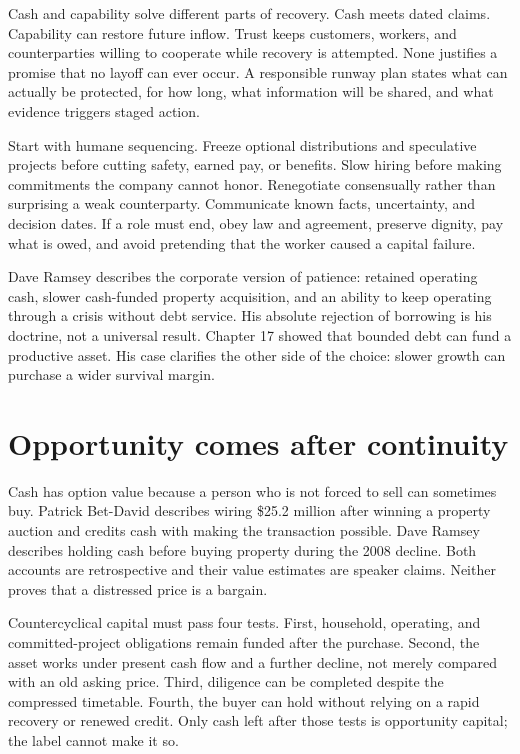 Cash and capability solve different parts of recovery. Cash meets dated claims.
Capability can restore future inflow. Trust keeps customers, workers, and
counterparties willing to cooperate while recovery is attempted. None justifies
a promise that no layoff can ever occur. A responsible runway plan states what
can actually be protected, for how long, what information will be shared, and
what evidence triggers staged action.

Start with humane sequencing. Freeze optional distributions and speculative
projects before cutting safety, earned pay, or benefits. Slow hiring before
making commitments the company cannot honor. Renegotiate consensually rather
than surprising a weak counterparty. Communicate known facts, uncertainty, and
decision dates. If a role must end, obey law and agreement, preserve dignity,
pay what is owed, and avoid pretending that the worker caused a capital
failure.

Dave Ramsey describes the corporate version of patience: retained operating
cash, slower cash-funded property acquisition, and an ability to keep operating
through a crisis without debt service. His absolute rejection of borrowing is
his doctrine, not a universal result. Chapter 17 showed that bounded debt can
fund a productive asset. His case clarifies the other side of the choice:
slower growth can purchase a wider survival margin.

\section{Opportunity comes after continuity}

Cash has option value because a person who is not forced to sell can sometimes
buy. Patrick Bet-David describes wiring \$25.2 million after winning a property
auction and credits cash with making the transaction possible. Dave Ramsey
describes holding cash before buying property during the 2008 decline. Both
accounts are retrospective and their value estimates are speaker claims.
Neither proves that a distressed price is a bargain.

Countercyclical capital must pass four tests. First, household, operating, and
committed-project obligations remain funded after the purchase. Second, the
asset works under present cash flow and a further decline, not merely compared
with an old asking price. Third, diligence can be completed despite the
compressed timetable. Fourth, the buyer can hold without relying on a rapid
recovery or renewed credit. Only cash left after those tests is opportunity
capital; the label cannot make it so.

